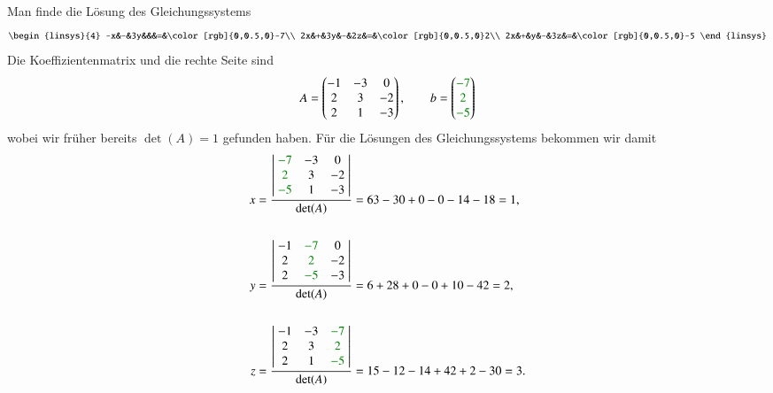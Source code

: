 \begin{beispiel}Man finde die Lösung des Gleichungssystems
\[
\begin{linsys}{4}
-x&-&3y&&&=&\color[rgb]{0,0.5,0}-7\\
2x&+&3y&-&2z&=&\color[rgb]{0,0.5,0}2\\
2x&+&y&-&3z&=&\color[rgb]{0,0.5,0}-5
\end{linsys}
\]
Die Koeffizientenmatrix und die rechte Seite sind
\[
A=\begin{pmatrix}
-1&-3&0\\
2&3&-2\\
2&1&-3
\end{pmatrix}
,\qquad
b=\begin{pmatrix}
\color[rgb]{0,0.5,0}-7\\\color[rgb]{0,0.5,0}2\\\color[rgb]{0,0.5,0}-5
\end{pmatrix}
\]
wobei wir früher bereits $\det(A)=1$ gefunden haben.
Für die Lösungen des Gleichungssystems bekommen wir damit
\begin{align*}
x&=\frac{
\left|\;
\begin{matrix}
\color[rgb]{0,0.5,0}-7&-3&0\\
\color[rgb]{0,0.5,0}2&3&-2\\
\color[rgb]{0,0.5,0}-5&1&-3
\end{matrix}
\;\right|
}{\det(A)}
=63-30+0-0-14-18=1,
\\
\\
y&=\frac{
\left|\;
\begin{matrix}
-1&\color[rgb]{0,0.5,0}-7&0\\
2&\color[rgb]{0,0.5,0}2&-2\\
2&\color[rgb]{0,0.5,0}-5&-3
\end{matrix}
\;\right|
}{\det(A)}
=6+28+0-0+10-42=2,
\\
\\
z&=\frac{
\left|\;
\begin{matrix}
-1&-3&\color[rgb]{0,0.5,0}-7\\
2&3&\color[rgb]{0,0.5,0}2\\
2&1&\color[rgb]{0,0.5,0}-5
\end{matrix}
\;\right|
}{\det(A)}
=15-12-14+42+2-30=3.
\end{align*}
\end{beispiel}

